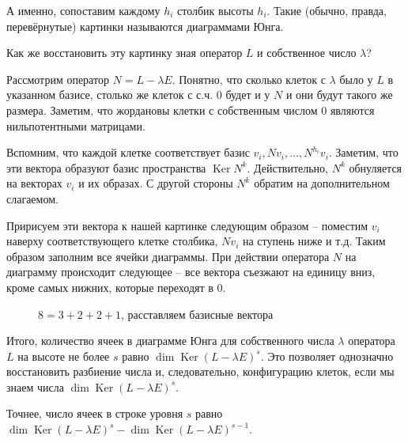\documentclass[10pt,a4paper,oneside]{book}
\theoremstyle{definition}
\DeclareMathOperator{\Ker}{Ker}
\begin{document}
А именно, сопоставим каждому $h_i$ столбик высоты $h_i$. Такие (обычно, правда, перевёрнутые) картинки называются диаграммами Юнга.

Как же восстановить эту картинку зная оператор $L$ и собственное число $\lambda$?

Рассмотрим оператор $N=L-\lambda E$. Понятно, что сколько клеток с $\lambda$ было у $L$ в указанном базисе, столько же клеток с с.ч. 0 будет и у $N$ и они будут такого же размера.
Заметим, что жордановы клетки с собственным числом 0 являются нильпотентными матрицами.



 Вспомним, что каждой клетке соответствует базис $v_i, N v_i, \dots,N^{h_i} v_i$. Заметим, что эти вектора образуют базис пространства $\Ker N^k$. Действительно, $N^k$ обнуляется на векторах $v_i$ и их образах. С другой стороны $N^k$ обратим на дополнительном слагаемом.

 Пририсуем эти вектора к нашей картинке следующим образом -- поместим $v_i$ наверху соответствующего клетке  столбика, $N v_i$ на ступень ниже и т.д. Таким образом заполним все ячейки диаграммы. При действии оператора $N$ на диаграмму происходит следующее -- все вектора съезжают на единицу вниз, кроме самых нижних, которые переходят в $0$.
\begin{figure}[hhh]
\begin{center}
\end{center}
\caption{$8=3+2+2+1$, расставляем базисные вектора}
\end{figure}
Итого, количество ячеек в диаграмме Юнга для собственного числа $\lambda$ оператора $L$ на высоте не более $s$ равно $\dim \Ker(L - \lambda E)^s $.
Это  позволяет однозначно восстановить разбиение числа и, следовательно, конфигурацию клеток, если мы знаем числа $\dim \Ker(L - \lambda E)^s $.

Точнее, число ячеек в строке уровня $s$ равно $\dim \Ker(L - \lambda E)^s -\dim \Ker(L - \lambda E)^{s-1} $.
\end{document}
